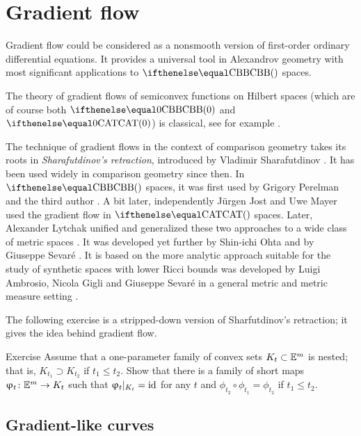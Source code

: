 \chapter{Gradient flow}\label{chap:grad}

Gradient flow could be considered as a nonsmooth version of first-order ordinary differential equations.
It provides a universal tool in Alexandrov geometry with most significant applications to $\Alex{}{}$ spaces. 

The theory of gradient flows of semiconvex functions on Hilbert spaces (which are of course both  $\Alex{0}{}$ and $\CAT{0}$)  is classical, see for example \cite{Brezis-book}.

 The technique of gradient flows in the context of comparison geometry takes its roots in \emph{Sharafutdinov's retraction}, 
introduced by Vladimir Sharafutdinov \cite{sharafutdinov}. 
It has been used  widely in comparison geometry since then.
In $\Alex{}$ spaces, it was first used by Grigory Perelman and the third author \cite{perelman-petrunin:qg, petrunin:qg}.
A bit later, independently Jürgen Jost and Uwe Mayer \cite{jost,mayer} 
used the gradient flow in $\CAT{}$ spaces.
Later, Alexander Lytchak unified and generalized these two approaches
to a wide class of metric spaces \cite{lytchak:open-map}.
It was developed  yet further by Shin-ichi Ohta \cite{ohta} and by Giuseppe Sevar\'e \cite{sevare}.
It is based on the more  analytic approach suitable for the study of synthetic spaces with lower Ricci bounds was developed by Luigi Ambrosio, Nicola Gigli and  Giuseppe Sevar\'e in a general metric and metric measure setting 
\cite{ambrosio-gigli-savare}.

{\sloppy 
The following exercise is a stripped-down version of Sharfutdinov's retraction;
it gives the idea behind gradient flow.

}

\begin{thm}{Exercise}\label{ex:sharafutdinov}
Assume that a one-parameter family of convex sets $K_t\subset \EE^m$ is nested; 
that is, $K_{t_1}\supset K_{t_2}$ if $t_1\le t_2$.
Show that there is a family of short maps $\phi_t\:\EE^m\to K_t$ 
such that $\upvarphi_t|_{K_t}=\mathop{\rm id}\nolimits$ for any $t$ and $\phi_{t_2}\circ\phi_{t_1}=\phi_{t_2}$ if $t_1\le t_2$.
\end{thm}




\section{Gradient-like curves}\label{sec:gradient-like}


